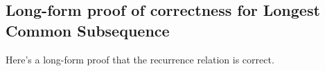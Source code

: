 

\continued

\subsection*{Long-form proof of correctness for Longest Common Subsequence}

Here's a long-form proof that the recurrence relation is correct.

